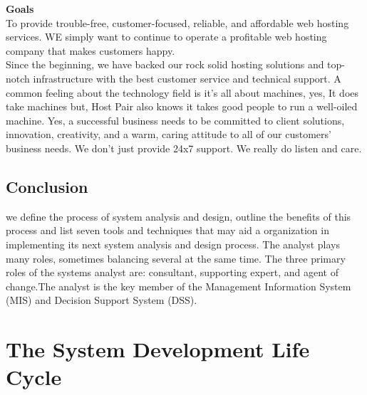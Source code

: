 \documentclass[a4paper,12pt]{report}
\begin{document}
\textbf{Goals}\\
To provide trouble-free, customer-focused, reliable, and affordable web hosting services. WE simply want
to continue to operate a profitable web hosting company that makes customers happy. \\Since the
beginning, we have backed our rock solid hosting solutions and top-notch infrastructure with the best
customer service and technical support. A common feeling about the technology field is it's all about
machines, yes, It does take machines but, Host Pair also knows it takes good people to run a well-oiled
machine. Yes, a successful business needs to be committed to client solutions, innovation, creativity, and
a warm, caring attitude to all of our customers' business needs. We don't just provide 24x7 support. We
really do listen and care.
\section{Conclusion}

 we define the process of system analysis and design, outline the benefits of this process and list seven tools and techniques that may aid a organization in implementing its next system analysis and design process.
 The analyst plays many roles, sometimes balancing several at the same time. The three primary roles of the systems analyst are: consultant, supporting expert, and agent of change.The analyst is the key member of the Management Information System (MIS) and Decision Support System (DSS).





\newpage
\chapter{The System Development Life Cycle }
\end{document}
